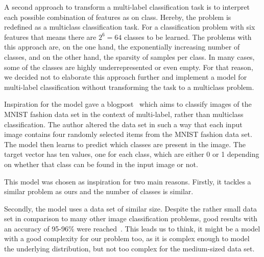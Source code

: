 A second approach to transform a multi-label classification task is to interpret each possible combination of features as on class. Hereby, the problem is redefined as a multiclass classification task. For a classification problem with six features that means there are \(2^{6} = 64\) classes to be learned. The problems with this approach are, on the one hand, the exponentially increasing number of classes, and on the other hand, the sparsity of samples per class. In many cases, some of the classes are highly underrepresented or even empty. For that reason, we decided not to elaborate this approach further and implement a model for multi-label classification without transforming the task to a multiclass problem.

\bigskip
Inspiration for the model gave a blogpost~\citep{blogpostMulti} which aims to classify images of the MNIST fashion data set in the context of multi-label, rather than multiclass classification. The author altered the data set in such a way that each input image contains four randomly selected items from the MNIST fashion data set. The model then learns to predict which classes are present in the image. The target vector has ten values, one for each class, which are either 0 or 1 depending on whether that class can be found in the input image or not.

This model was chosen as inspiration for two main reasons. Firstly, it tackles a similar problem as ours and the number of classes is similar.

Secondly, the model uses a data set of similar size. Despite the rather small data set in comparison to many other image classification problems, good results with an accuracy of 95-96\% were reached~\citep{blogpostMulti}. This leads us to think, it might be a model with a good complexity for our problem too, as it is complex enough to model the underlying distribution, but not too complex for the medium-sized data set.


